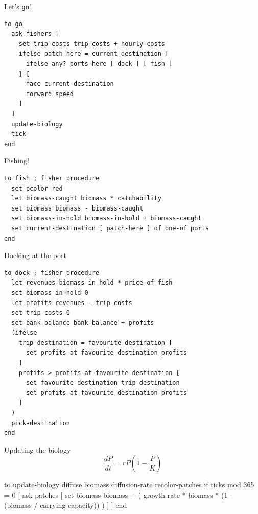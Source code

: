 \documentclass[table, 14pt, aspectratio=169]{beamer}
\begin{document}
\begin{frame}[fragile=singleslide]{Let's \texttt{go}!}
  \begin{adjustbox}{max height=0.8\textheight, max width = \linewidth}
    \begin{verbatim}
to go
  ask fishers [
    set trip-costs trip-costs + hourly-costs
    ifelse patch-here = current-destination [
      ifelse any? ports-here [ dock ] [ fish ]
    ] [
      face current-destination
      forward speed
    ]
  ]
  update-biology
  tick
end
    \end{verbatim}
  \end{adjustbox}
\end{frame}

\begin{frame}[fragile=singleslide]{Fishing!}
  \begin{adjustbox}{max height=0.8\textheight, max width = \linewidth}
    \begin{verbatim}
to fish ; fisher procedure
  set pcolor red
  let biomass-caught biomass * catchability
  set biomass biomass - biomass-caught
  set biomass-in-hold biomass-in-hold + biomass-caught
  set current-destination [ patch-here ] of one-of ports
end
    \end{verbatim}
  \end{adjustbox}
\end{frame}

\begin{frame}[fragile=singleslide]{Docking at the port}
  \begin{adjustbox}{max height=0.8\textheight, max width = \linewidth}
    \begin{verbatim}
to dock ; fisher procedure
  let revenues biomass-in-hold * price-of-fish
  set biomass-in-hold 0
  let profits revenues - trip-costs
  set trip-costs 0
  set bank-balance bank-balance + profits
  (ifelse
    trip-destination = favourite-destination [
      set profits-at-favourite-destination profits
    ]
    profits > profits-at-favourite-destination [
      set favourite-destination trip-destination
      set profits-at-favourite-destination profits
    ]
  )
  pick-destination
end
    \end{verbatim}
  \end{adjustbox}
\end{frame}


\begin{frame}[fragile=singleslide]{Updating the biology}
  \vfill
  $$\frac{dP}{dt}=r P \left(1 - \frac{P}{K}\right)$$
  \vfill
  \begin{adjustbox}{max width=\linewidth}
    \begin{nlogo}
to update-biology
  diffuse biomass diffusion-rate
  recolor-patches
  if ticks mod 365 = 0 [
    ask patches [
      set biomass biomass + (
        growth-rate * biomass * (1 - (biomass / carrying-capacity))
      )
    ]
  ]
end
    \end{nlogo}
  \end{adjustbox}
\end{frame}
\end{document}
